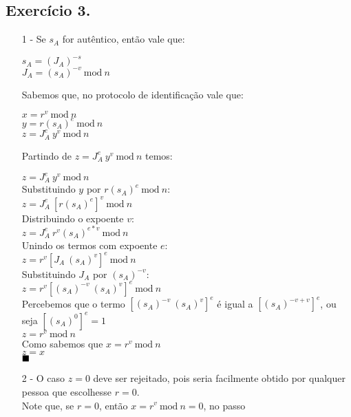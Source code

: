 \documentclass[12pt]{article}
\newcommand{\modd}{\ \text{mod}\ }
\newcommand*{\QED}{\hfill\ensuremath{\blacksquare}}
\begin{document}
	\subsection*{Exercício 3.}
		\begin{itemize}
			\item[1 -]
				Se $\mathit{s_A}$ for autêntico, então vale que:\\
				\begin{center}
					$\mathit{s_A} = (J_A)^{-s}$\\
					$J_A = (s_A)^{-v} \modd n$
				\end{center}
				Sabemos que, no protocolo de identificação vale que:\\
				\begin{center}
					$x = r^v \modd n$\\
					$y = r(s_A)^{e} \modd n$\\
					$z = J_A^{e} \ y^v \modd n$
				\end{center}
				Partindo de $z = J_A^{e} \ y^v \modd n$ temos:\\
				\begin{center}
					$z = J_A^{e} \ y^v \modd n$\\
					Substituindo $y$ por $ r(s_A)^{e} \modd n$:\\
					$z = J_A^{e} \  [r(s_A)^{e}]^v \modd n$\\
					Distribuindo o expoente $v$:\\
					$z = J_A^{e} \  r^v(s_A)^{e*v} \modd n$\\
					Unindo os termos com expoente $e$:\\
					$z = r^v [J_A \ (s_A)^{v}]^{e} \modd n$\\
					Substituindo $J_A$ por $(s_A)^{-v}$:\\
					$z = r^v [(s_A)^{-v} \ (s_A)^{v}]^{e} \modd n$\\
					Percebemos que o termo $[(s_A)^{-v} \ (s_A)^{v}]^{e}$ é igual
					a $[(s_A)^{-v + v}]^{e}$, ou seja $[(s_A)^{0}]^{e} = 1$\\
					$z = r^v \modd n$\\
					Como sabemos que $x = r^v \modd n$\\
					$z = x$\\
					$\QED$
				\end{center}
			\item[2 -]
				O caso $z = 0$ deve ser rejeitado, pois seria facilmente obtido
				por qualquer pessoa que escolhesse $r = 0$.\\
				Note que, se $r = 0$, então $x = r^v \modd n = 0$, no passo

\end{itemize}
\end{document}
